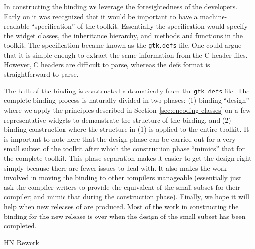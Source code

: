 \documentclass[workingdraft]{usetex-v1}
\begin{document}
In constructing the \mgtk binding we leverage the foresightedness of
the \gtk developers. Early on it was recognized that it would be
important to have a machine-readable ``specification'' of the toolkit.
Essentially the specification would specify the widget classes, the
inheritance hierarchy, and methods and functions in the toolkit. The
specification became known as the \texttt{gtk.defs} file. One could
argue that it is simple enough to extract the same information from
the C header files. However, C headers are difficult to parse, whereas
the defs format is straightforward to parse.

The bulk of the \mgtk binding is constructed automatically from the
\texttt{gtk.defs} file.  The complete binding process is naturally
divided in two phases: (1) binding ``design'' where we apply the
principles described in Section~\ref{sec:encoding-classes} on a few
representative widgets to demonstrate the structure of the binding,
and (2) binding construction where the structure in (1) is applied to
the entire toolkit. It is important to note here that the design phase
can be carried out for a very small subset of the toolkit after which
the construction phase ``mimics'' that for the complete toolkit.
This phase separation makes it easier to get the design right simply
because there are fewer issues to deal with.  It also makes the work
involved in moving the binding to other \sml compilers manageable
(essentially just ask the compiler writers to provide the equivalent
of the small subset for their compiler; and mimic that during the
construction phase). Finally, we hope it will help when new releases
of \gtk are produced. Most of the work in constructing the binding for
the new release is over when the design of the small subset has been
completed.

\begin{ednote}{HN} Rework \end{ednote}
\end{document}
